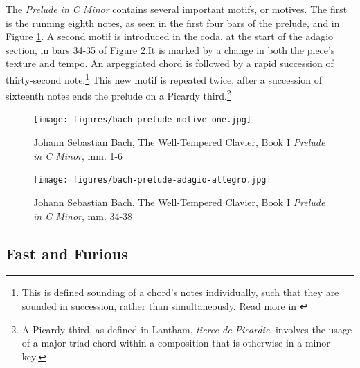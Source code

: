 The \textit{Prelude in C Minor} contains several important motifs, or motives. The first is the running eighth notes, as seen in the first four bars of the prelude, and in Figure \ref{fig:bach-first-motive}\autocite{Henle_2009}. A second motif is introduced in the coda, at the start of the adagio section, in bars 34-35 of Figure \ref{fig:prelude-recitative}\autocite{Henle_2009}.It is marked by a change in both the piece's texture and tempo. An arpeggiated chord is followed by a rapid succession of thirty-second note.\footnote{This is defined sounding of a chord's notes individually, such that they are sounded in succession, rather than simultaneously. Read more in \cite{Arpeggio_2001}} This new motif is repeated twice, after a succession of sixteenth notes ends the prelude on a Picardy third.\footnote{A Picardy third, as defined in Lantham, \textit{tierce de Picardie}, involves the usage of a major triad chord within a composition that is otherwise in a minor key.}

\begin{figure}[ht]
    \centering
    \texttt{[image: figures/bach-prelude-motive-one.jpg]}
    \caption{Johann Sebastian Bach, The Well-Tempered Clavier, Book I \textit{Prelude in C Minor}, mm. 1-6}
    \label{fig:bach-first-motive}
\end{figure}

\begin{figure}[ht]
    \centering
    \texttt{[image: figures/bach-prelude-adagio-allegro.jpg]}
    \caption{Johann Sebastian Bach, The Well-Tempered Clavier, Book I \textit{Prelude in C Minor}, mm. 34-38}
    \label{fig:prelude-recitative}
\end{figure}

\subsection{Fast and Furious}

